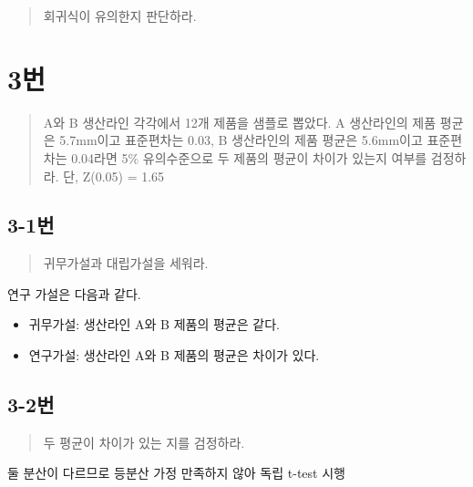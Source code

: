 \documentclass[
  letterpaper,
  DIV=11,
  numbers=noendperiod]{scrreprt}
\providecommand{\tightlist}{%
  \setlength{\itemsep}{0pt}\setlength{\parskip}{0pt}}\usepackage{longtable,booktabs,array}
\begin{document}

\begin{quote}
회귀식이 유의한지 판단하라.
\end{quote}

\hypertarget{uxbc88-70}{%
\chapter*{3번}\label{uxbc88-70}}


\begin{quote}
A와 B 생산라인 각각에서 12개 제품을 샘플로 뽑았다. A 생산라인의 제품
평균은 5.7mm이고 표준편차는 0.03, B 생산라인의 제품 평균은 5.6mm이고
표준편차는 0.04라면 5\% 유의수준으로 두 제품의 평균이 차이가 있는지
여부를 검정하라. 단, Z(0.05) = 1.65
\end{quote}

\hypertarget{uxbc88-71}{%
\section*{3-1번}\label{uxbc88-71}}


\begin{quote}
귀무가설과 대립가설을 세워라.
\end{quote}

연구 가설은 다음과 같다.

\begin{itemize}
\tightlist
\item
  귀무가설: 생산라인 A와 B 제품의 평균은 같다.
\item
  연구가설: 생산라인 A와 B 제품의 평균은 차이가 있다.
\end{itemize}

\hypertarget{uxbc88-72}{%
\section*{3-2번}\label{uxbc88-72}}


\begin{quote}
두 평균이 차이가 있는 지를 검정하라.
\end{quote}

둘 분산이 다르므로 등분산 가정 만족하지 않아 독립 t-test 시행
\end{document}
